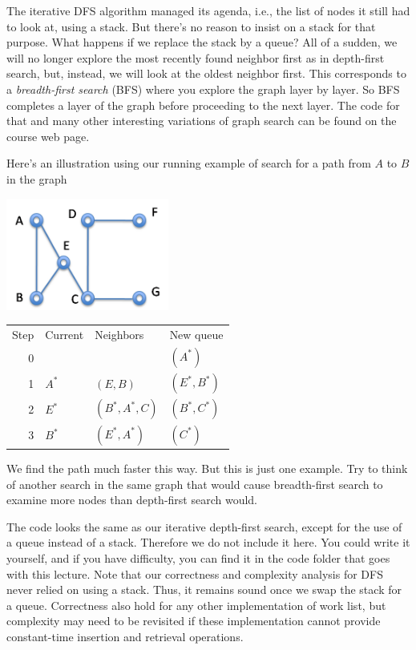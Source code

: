The iterative DFS algorithm managed its agenda, i.e., the list of
nodes it still had to look at, using a stack.  But there's no reason
to insist on a stack for that purpose.  What happens if we replace the
stack by a queue?  All of a sudden, we will no longer explore the most
recently found neighbor first as in depth-first search, but, instead,
we will look at the oldest neighbor first.  This corresponds to a
\emph{breadth-first search} (BFS) where you explore the graph layer by
layer.  So BFS completes a layer of the graph before proceeding to the
next layer.  The code for that and many other interesting variations
of graph search can be found on the course web page.

Here's an illustration using our running example of search for a path
from $A$ to $B$ in the graph
\begin{center}
  \includegraphics[width=0.4\textwidth]{img/dfs3.png}
\end{center}

\medskip
\begin{tabular}{rlll}
  Step & Current & Neighbors & New queue \\
  0 &  &  & $(A^*)$ \\
  1 & $A^*$ & $(E,B)$ & $(E^*,B^*)$ \\
  2 & $E^*$ & $(B^*, A^*, C)$ & $(B^*, C^*)$ \\
  3 & $B^*$ & $(E^*,A^*)$ & $(C^*)$ \\
\end{tabular}

\medskip
We find the path much faster this way. But this is just one
example. Try to think of another search in the same graph that would
cause breadth-first search to examine more nodes than depth-first
search would.

The code looks the same as our iterative depth-first search, except
for the use of a queue instead of a stack. Therefore we do not include
it here. You could write it yourself, and if you have difficulty, you
can find it in the code folder that goes with this lecture.  Note that
our correctness and complexity analysis for DFS never relied on using
a stack.  Thus, it remains sound once we swap the stack for a queue.
Correctness also hold for any other implementation of work list, but
complexity may need to be revisited if these implementation cannot
provide constant-time insertion and retrieval operations.


